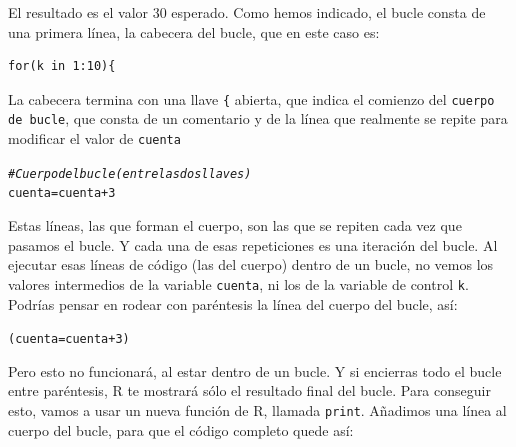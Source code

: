 \documentclass[10pt,a4paper]{article}\usepackage[]{graphicx}\usepackage[]{color}
\makeatletter
\newcommand{\hlnum}[1]{\textcolor[rgb]{0.686,0.059,0.569}{#1}}%
\newcommand{\hlcom}[1]{\textcolor[rgb]{0.678,0.584,0.686}{\textit{#1}}}%
\newcommand{\hlopt}[1]{\textcolor[rgb]{0,0,0}{#1}}%
\newcommand{\hlstd}[1]{\textcolor[rgb]{0.345,0.345,0.345}{#1}}%
\newcommand{\hlkwb}[1]{\textcolor[rgb]{0.69,0.353,0.396}{#1}}%
\newenvironment{kframe}{%
 \def\at@end@of@kframe{}%
 \ifinner\ifhmode%
  \def\at@end@of@kframe{\end{minipage}}%
  \begin{minipage}{\columnwidth}%
 \fi\fi%
 \def\FrameCommand##1{\hskip\@totalleftmargin \hskip-\fboxsep
 \colorbox{shadecolor}{##1}\hskip-\fboxsep
     \hskip-\linewidth \hskip-\@totalleftmargin \hskip\columnwidth}%
 \MakeFramed {\advance\hsize-\width
   \@totalleftmargin\z@ \linewidth\hsize
   \@setminipage}}%
 {\par\unskip\endMakeFramed%
 \at@end@of@kframe}
\newenvironment{knitrout}{}{} %
\newcounter {cont01}
\makeatother
\begin{document}
El resultado es el valor $30$ esperado. Como hemos indicado, el bucle consta de una primera línea, la {\sf cabecera} del bucle, que en este caso es:
\begin{knitrout}
\color{fgcolor}\begin{kframe}
\begin{verbatim}
for(k in 1:10){
\end{verbatim}
\end{kframe}
\end{knitrout}
La cabecera termina con una llave \verb#{# abierta, que indica el comienzo del {\tt cuerpo de bucle}, que consta de un comentario y de la línea que realmente se repite para modificar el valor de {\tt cuenta}
\begin{knitrout}
\color{fgcolor}\begin{kframe}
\begin{alltt}
        \hlcom{# Cuerpo del bucle (entre las dos llaves)}
        \hlstd{cuenta} \hlkwb{=} \hlstd{cuenta} \hlopt{+} \hlnum{3}
\end{alltt}
\end{kframe}
\end{knitrout}
Estas líneas, las que forman el cuerpo, son las que se repiten cada vez que pasamos el bucle. Y cada una de esas repeticiones es una {\sf iteración} del bucle.
Al ejecutar esas líneas de código (las del cuerpo) dentro de un bucle, no vemos los valores intermedios de la variable {\tt cuenta}, ni los de la variable de control {\tt k}. Podrías pensar en rodear con paréntesis  la línea del cuerpo del bucle, así:
\begin{knitrout}
\color{fgcolor}\begin{kframe}
\begin{alltt}
\hlstd{(cuenta} \hlkwb{=} \hlstd{cuenta} \hlopt{+} \hlnum{3}\hlstd{)}
\end{alltt}
\end{kframe}
\end{knitrout}
Pero esto no funcionará, al estar dentro de un bucle. Y si encierras todo el bucle entre paréntesis, R te mostrará sólo el resultado final del bucle. Para conseguir esto, vamos a usar un nueva función de R, llamada {\tt print}. Añadimos una línea al cuerpo del bucle, para que el código completo quede así:
\end{document}

